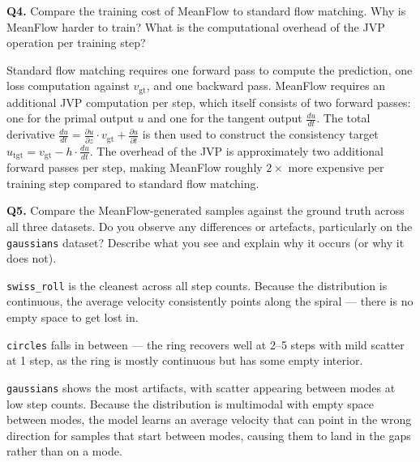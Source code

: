 \documentclass[11pt, a4paper]{article}
\begin{document}
\textbf{Q4.}
Compare the training cost of MeanFlow to standard flow matching.  Why is
MeanFlow harder to train?  What is the computational overhead of the JVP
operation per training step?

Standard flow matching requires one forward pass to compute the
prediction, one loss computation against $v_{\text{gt}}$, and one
backward pass. MeanFlow requires an additional JVP computation per
step, which itself consists of two forward passes: one for the primal
output $u$ and one for the tangent output $\frac{du}{dt}$. The total
derivative $\frac{du}{dt} = \frac{\partial u}{\partial z} \cdot
v_{\text{gt}} + \frac{\partial u}{\partial t}$ is then used to
construct the consistency target $u_{\text{tgt}} = v_{\text{gt}} -
h \cdot \frac{du}{dt}$. The overhead of the JVP is approximately two
additional forward passes per step, making MeanFlow roughly $2\times$
more expensive per training step compared to standard flow matching.

\textbf{Q5.}
Compare the MeanFlow-generated samples against the ground truth across all
three datasets.  Do you observe any differences or artefacts, particularly on
the \texttt{gaussians} dataset?  Describe what you see and explain why it
occurs (or why it does not).

\texttt{swiss\_roll} is the cleanest across all step counts. Because
the distribution is continuous, the average velocity consistently
points along the spiral — there is no empty space to get lost in.

\texttt{circles} falls in between — the ring recovers well at 2--5
steps with mild scatter at 1 step, as the ring is mostly continuous
but has some empty interior.

\texttt{gaussians} shows the most artifacts, with scatter appearing
between modes at low step counts. Because the distribution is
multimodal with empty space between modes, the model learns an
average velocity that can point in the wrong direction for samples
that start between modes, causing them to land in the gaps rather
than on a mode.

\newpage
\thispagestyle{empty}
\appendix
\printbibliography
\end{document}
